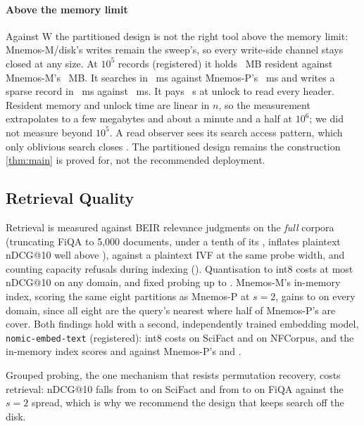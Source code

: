 \paragraph{Above the memory limit}
Against W the partitioned design is not the right tool above the memory limit: Mnemos-M/disk's
writes remain the sweep's, so every write-side channel stays closed at any size. At $10^5$ records
(registered) it holds \REtwentyfiveDiskRAM~MB resident
against Mnemos-M's \REtwentyfiveMemRAM~MB. It searches in \REtwentyfiveDiskSearch~ms against
Mnemos-P's \REtwentyfivePSearch~ms and writes a sparse record in \REtwentyfiveDiskPut~ms against
\REtwentyfivePPut~ms. It pays \REtwentyfiveDiskUnlock~s at unlock to read every header. Resident
memory and unlock time are linear in $n$, so the measurement extrapolates to a few megabytes and
about a minute and a half at $10^6$; we did not measure beyond $10^5$. A read observer sees its
search access pattern, which only oblivious search closes
\cite{rathee2026onyx,kaviani2026opal,zhu2025compass}. The partitioned design remains the
construction \cref{thm:main} is proved for, not the recommended deployment.

\subsection{Retrieval Quality}
\label{sec:eval-recall}

Retrieval is measured against BEIR relevance judgments on the \emph{full} corpora (truncating FiQA
to 5{,}000 documents, under a tenth of its \REelevenFiqaSize, inflates plaintext nDCG@10 well above
\REelevenFiqa), against a plaintext IVF at the same probe width, and counting capacity refusals
during indexing (\REelevenRefusals). Quantisation to int8 costs at most \REelevenWorstQuant{}
nDCG@10 on any domain, and fixed probing up to \REelevenProbeCostMax. Mnemos-M's in-memory index,
scoring the same eight partitions as Mnemos-P at $s = 2$, gains \REelevenIvfGainMin{} to
\REelevenIvfGainMax{} on every domain, since all eight are the query's nearest where half of
Mnemos-P's are cover. Both findings hold with a second, independently trained embedding model,
\texttt{nomic-embed-text} (registered): int8 costs \REtwentysixSciQuant{} on
SciFact and \REtwentysixNfQuant{} on NFCorpus, and the in-memory index scores \REtwentysixSciMIvf{}
and \REtwentysixNfMIvf{} against Mnemos-P's \REtwentysixSciP{} and \REtwentysixNfP.

Grouped probing, the one mechanism that resists permutation recovery, costs retrieval: nDCG@10
falls from \REelevenGroupedSScifact{} to \REelevenGroupedScifact{} on SciFact and from
\REelevenGroupedSFiqa{} to \REelevenGroupedFiqa{} on FiQA against the $s=2$ spread, which is why we
recommend the design that keeps search off the disk.

